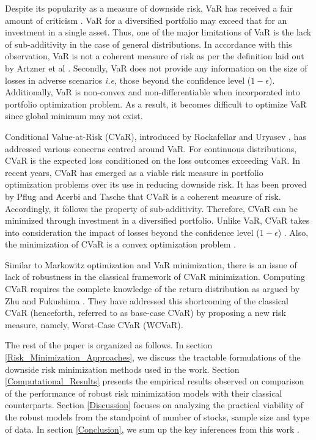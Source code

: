 \documentclass[12pt]{article}
\numberwithin{equation}{section}
\begin{document}
Despite its popularity as a measure of downside risk, VaR has received a fair amount of criticism \cite{capinski_risk,zhu,lim}. VaR for a diversified portfolio may exceed that for an investment in a single asset. Thus, one of the major limitations of VaR is the lack of sub-additivity in the case of general distributions. In accordance with this observation, VaR is not a coherent measure of risk as per the definition laid out by Artzner et al \cite{artzner}. Secondly, VaR does not provide any information on the size of losses in adverse scenarios \textit{i.e,} those beyond the confidence level ($1-\epsilon$). Additionally, VaR is non-convex and non-differentiable when incorporated into portfolio optimization problem. As a result, it becomes difficult to optimize VaR since global minimum may not exist. 

Conditional Value-at-Risk (CVaR), introduced by Rockafellar and Uryasev \cite{rockafellar1,rockafellar2}, has addressed various concerns centred around VaR. For continuous distributions, CVaR is the expected loss conditioned on the loss outcomes exceeding VaR. In recent years, CVaR has emerged as a viable risk measure in portfolio optimization problems over its use in reducing downside risk. It has been proved by Pflug \cite{pflug} and Acerbi and Tasche \cite{acerbi} that CVaR is a coherent measure of risk. Accordingly, it follows the property of sub-additivity. Therefore, CVaR can be minimized through investment in a diversified portfolio. Unlike VaR, CVaR takes into consideration the impact of losses beyond the confidence level ($1-\epsilon$) \cite{capinski_risk}. Also, the minimization of CVaR is a convex optimization problem \cite{lim}.

Similar to Markowitz optimization and VaR minimization, there is an issue of lack of robustness in the classical framework of CVaR minimization. Computing CVaR requires the complete knowledge of the return distribution as argued by Zhu and Fukushima \cite{zhu}. They have addressed this shortcoming of the classical CVaR (henceforth, referred to as base-case CVaR) by proposing a new risk measure, namely, Worst-Case CVaR (WCVaR). 

The rest of the paper is organized as follows. In section \ref{Risk_Minimization_Approaches}, we discuss the tractable formulations of the downside risk minimization methods used in the work. Section \ref{Computational_Results} presents the empirical results observed on comparison of the performance of robust risk minimization models with their classical counterparts. Section \ref{Discussion} focuses on analyzing the practical viability of the robust models from the standpoint of number of stocks, sample size and type of data. In section \ref{Conclusion}, we sum up the key inferences from this work .
\end{document}
